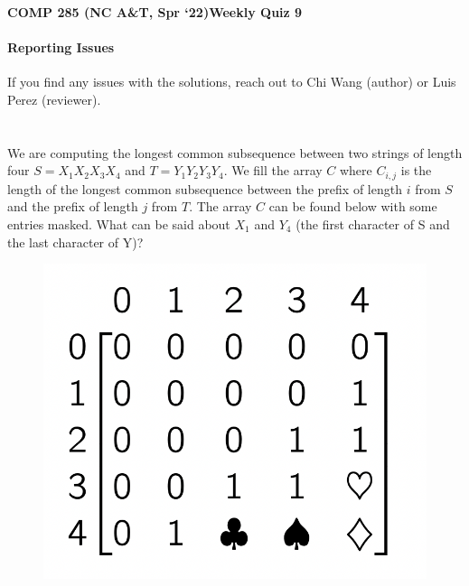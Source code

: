 \documentclass [12pt]{article}
\begin{document}
 

{\LARGE \textbf {COMP 285 (NC A\&T, Spr `22)}\hfill \textbf {Weekly Quiz 9} } 

\begin{Instruction}

\paragraph{Reporting Issues} If you find any issues with the solutions, reach out to Chi Wang (author) or Luis Perez (reviewer).

\end{Instruction}


\section{} We are computing the longest common subsequence between two strings of length four $S = X_1X_2X_3X_4$ and $T = Y_1Y_2Y_3Y_4$. We fill the array $C$ where $C_{i ,j}$ is the length of the longest common subsequence between the prefix of length $i$ from $S$ and the prefix of length $j$ from $T$. The array $C$ can be found below with some entries masked. What can be said about $X_1$ and $Y_4$ (the first character of S and the last character of Y)?


\begin{figure}[H]
    \centering
    \includegraphics[scale=0.5]{9.png} 
    \label{fig:my_label}
\end{figure}
\end{document}
